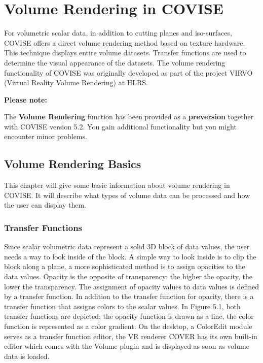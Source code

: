 
\begin{htmlonly}



    
\end{htmlonly}



\startdocument
\chapter{Volume Rendering in COVISE}
\label{Volume_Rendering}

For volumetric scalar data, in addition to cutting planes and iso-surfaces, COVISE offers a direct volume 
rendering method based on texture hardware. This technique displays entire volume datasets. 
Transfer functions are used to determine the visual appearance of the datasets. The volume rendering
functionality of COVISE was originally developed as part of the project VIRVO (Virtual Reality Volume Rendering)
at HLRS.

{\bf Please note:}

The {\bf Volume Rendering} function has been provided as a {\bf preversion} together with COVISE version 5.2.
You gain additional functionality but you might encounter minor problems.

\section{Volume Rendering Basics}

This chapter will give some basic information about volume rendering in COVISE. It will describe what
types of volume data can be processed and how the user can display them.

\subsection{Transfer Functions}

Since scalar volumetric data represent a solid 3D block of data values, the user needs a way to look 
inside of the block. A simple way to look inside is to clip the block along a plane, a more sophisticated 
method is to assign opacities to the data values. Opacity is the opposite of
transparency: the higher the opacity, the lower the transparency. The assignment of opacity values to 
data values is defined by a transfer function. In addition to the transfer function for opacity, there is a 
transfer function that assigns colors to the scalar values. In Figure 5.1, both transfer functions are
depicted: the opacity function is drawn as a line, the color function is represented as a color gradient.
On the desktop, a ColorEdit module serves as a transfer function editor,
the VR renderer COVER has its own built-in editor which comes with the Volume plugin and is displayed
as soon as volume data is loaded.


